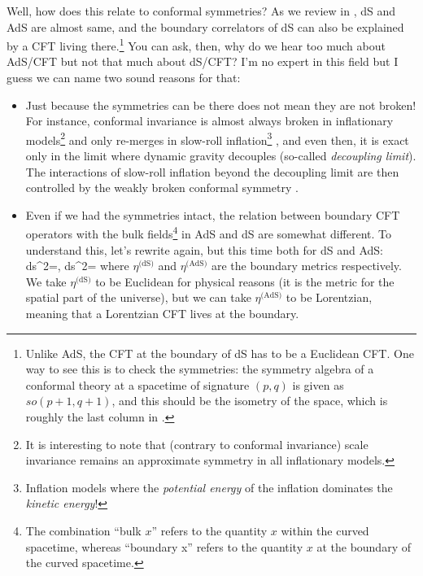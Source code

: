 Well, how does this relate to conformal symmetries? As we review in \tabref{\ref{table: comparison of spaces of maximal symmetry}}, dS and AdS are almost same, and the boundary correlators of dS can also be explained by a CFT living there.\footnote{Unlike AdS, the CFT at the boundary of dS has to be a Euclidean CFT. One way to see this is to check the symmetries: the symmetry algebra of a conformal theory at a spacetime of signature $(p,q)$ is given as $so(p+1,q+1)$, and this should be the isometry of the space, which is roughly the last column in \tabref{\ref{table: comparison of spaces of maximal symmetry}}.} You can ask, then, why do we hear too much about AdS/CFT but not that much about dS/CFT? I'm no expert in this field but I guess we can name two sound reasons for that:
\begin{itemize}
	\item Just because the symmetries can be there does not mean they are not broken! For instance, conformal invariance is almost always broken in inflationary models\footnote{It is interesting to note that (contrary to conformal invariance) scale invariance remains an approximate symmetry in all inflationary models.} and only re-merges in slow-roll inflation\footnote{Inflation models where the \emph{potential energy} of the inflation dominates the \emph{kinetic energy}!} \cite{Baumann:2019ghk}, and even then, it is exact only in the limit where dynamic gravity decouples (so-called \emph{decoupling limit}). The interactions of slow-roll inflation beyond the decoupling limit are then controlled by the weakly broken conformal symmetry \cite{Arkani-Hamed:2015bza,Arkani-Hamed:2018kmz,Mata:2012bx}.
	
	\item Even if we had the symmetries intact, the relation between boundary CFT operators with the bulk fields\footnote{The combination ``bulk $x$'' refers to the quantity $x$ within the curved spacetime, whereas ``boundary x'' refers to the quantity $x$ at the boundary of the curved spacetime.} in AdS and dS are somewhat different. To understand this, let's rewrite  again, but this time both for dS and AdS:
	\be
	ds^2=\;\;,\; ds^2=\;
	\ee 
	where $\eta^{\text{(dS)}}$ and $\eta^{\text{(AdS)}}$ are the boundary metrics respectively. We take $\eta^{\text{(dS)}}$ to be Euclidean for physical reasons (it is the metric for the spatial part of the universe), but we can take $\eta^{\text{(AdS)}}$ to be Lorentzian, meaning that a Lorentzian CFT lives at the boundary.
	

\end{itemize}
